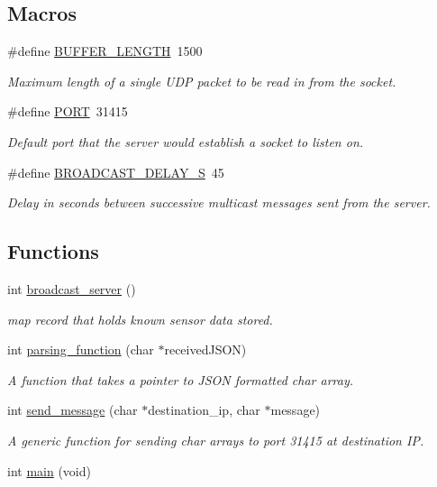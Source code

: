 \subsection*{Macros}
\begin{DoxyCompactItemize}
\item 
\#define \mbox{\hyperlink{train-_a-wear__server_8cpp_af7b7dc9a200cb1404c280bd500fd1551}{B\+U\+F\+F\+E\+R\+\_\+\+L\+E\+N\+G\+TH}}~1500
\begin{DoxyCompactList}\small\item\em Maximum length of a single U\+DP packet to be read in from the socket. \end{DoxyCompactList}\item 
\#define \mbox{\hyperlink{train-_a-wear__server_8cpp_a614217d263be1fb1a5f76e2ff7be19a2}{P\+O\+RT}}~31415
\begin{DoxyCompactList}\small\item\em Default port that the server would establish a socket to listen on. \end{DoxyCompactList}\item 
\#define \mbox{\hyperlink{train-_a-wear__server_8cpp_aa7a1101e9cec886e9ade667195fadb5a}{B\+R\+O\+A\+D\+C\+A\+S\+T\+\_\+\+D\+E\+L\+A\+Y\+\_\+S}}~45
\begin{DoxyCompactList}\small\item\em Delay in seconds between successive multicast messages sent from the server. \end{DoxyCompactList}\end{DoxyCompactItemize}
\subsection*{Functions}
\begin{DoxyCompactItemize}
\item 
int \mbox{\hyperlink{train-_a-wear__server_8cpp_a0fca5c05bd3ddbf5a153d3b9d43c25f1}{broadcast\+\_\+server}} ()
\begin{DoxyCompactList}\small\item\em map record that holds known sensor data stored. \end{DoxyCompactList}\item 
int \mbox{\hyperlink{train-_a-wear__server_8cpp_acdb6c6606c64b3a5b7b952f030fb5b4e}{parsing\+\_\+function}} (char $\ast$received\+J\+S\+ON)
\begin{DoxyCompactList}\small\item\em A function that takes a pointer to J\+S\+ON formatted char array. \end{DoxyCompactList}\item 
int \mbox{\hyperlink{train-_a-wear__server_8cpp_a95b7d8dc0b0f9099cbd8370e65e36ebd}{send\+\_\+message}} (char $\ast$destination\+\_\+ip, char $\ast$message)
\begin{DoxyCompactList}\small\item\em A generic function for sending char arrays to port 31415 at destination IP. \end{DoxyCompactList}\item 
int \mbox{\hyperlink{train-_a-wear__server_8cpp_a840291bc02cba5474a4cb46a9b9566fe}{main}} (void)
\end{DoxyCompactItemize}
